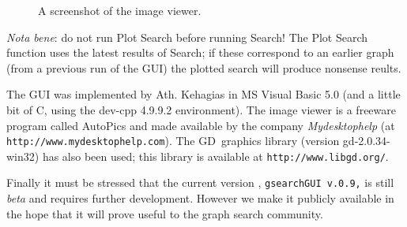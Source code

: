 \documentclass[11pt]{article}\usepackage{amsmath}
\begin{document}
\begin{figure}[h]
\centering{}\caption{A
screenshot of the image viewer.}\label{fig16}\end{figure}

\noindent \emph{Nota bene}: do not run \textsf{Plot Search} before running
\textsf{Search}! The \textsf{Plot Search} function uses the latest results of
\textsf{Search}; if these correspond to an earlier graph (from a previous run
of the GUI) the plotted search will produce nonsense reults.

The GUI was implemented by Ath. Kehagias in MS Visual Basic 5.0 (and a little
bit of C, using the dev-cpp 4.9.9.2 environment). The image viewer is a
freeware program called AutoPics and made available by the company
\emph{Mydesktophelp} (at \texttt{http://www.mydesktophelp.com}). The
GD\ graphics library (version gd-2.0.34-win32) has also been used; this
library is available at \texttt{http://www.libgd.org/}.

Finally it must be stressed that the current version , \texttt{gsearchGUI
v.0.9,} is still \emph{beta} and requires further development. However we make
it publicly available in the hope that it will prove useful to the graph
search community.

\newpage

\clearpage
\end{document}
